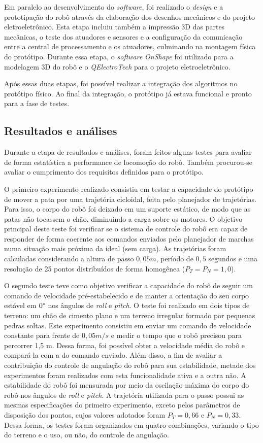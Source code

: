 \documentclass[../main.tex]{subfiles}
\begin{document}
  Em paralelo ao desenvolvimento do \textit{software}, foi realizado o \textit{design} e a prototipação do robô através da elaboração dos desenhos mecânicos e do projeto eletroeletrônico. Esta etapa incluiu também a impressão 3D das partes mecânicas, o teste dos atuadores e sensores e a configuração da comunicação entre a central de processamento e os atuadores, culminando na montagem física do protótipo. Durante essa etapa, o \textit{software} \textit{OnShape} foi utilizado para a modelagem 3D do robô e o \textit{QElectroTech} para o projeto eletroeletrônico.

  Após essas duas etapas, foi possível realizar a integração dos algoritmos no protótipo físico. Ao final da integração, o protótipo já estava funcional e pronto para a fase de testes.

  \subsection{Resultados e análises}
  \label{sec:method_results_analysis}
  Durante a etapa de resultados e análises, foram feitos alguns testes para avaliar de forma estatística a performance de locomoção do robô. Também procurou-se avaliar o cumprimento dos requisitos definidos para o protótipo.

  O primeiro experimento realizado consistiu em testar a capacidade do protótipo de mover a pata por uma trajetória cicloidal, feita pelo planejador de trajetórias. Para isso, o corpo do robô foi deixado em um suporte estático, de modo que as patas não tocassem o chão, diminuindo a carga sobre os motores. O objetivo principal deste teste foi verificar se o sistema de controle do robô era capaz de responder de forma coerente aos comandos enviados pelo planejador de marchas numa situação mais próxima da ideal (sem carga). As trajetórias foram calculadas considerando a altura de passo $0,05m$, período de $0,5$ segundos e uma resolução de 25 pontos distribuídos de forma homogênea ($P_T = P_N = 1,0$).
  
  O segundo teste teve como objetivo verificar a capacidade do robô de seguir um comando de velocidade pré-estabelecido e de manter a orientação do seu corpo estável em $0\degree$ nos ângulos de \textit{roll} e \textit{pitch}. O teste foi realizado em dois tipos de terreno: um chão de cimento plano e um terreno irregular formado por pequenas pedras soltas. Este experimento consistiu em enviar um comando de velocidade constante para frente de $0,05 m/s$ e medir o tempo que o robô precisou para percorrer 1,5 m. Dessa forma, foi possível obter a velocidade média do robô e compará-la com a do comando enviado. Além disso, a fim de avaliar a contribuição do controle de angulação do robô para sua estabilidade, metade dos experimentos foram realizados com esta funcionalidade ativa e a outra não. A estabilidade do robô foi mensurada por meio da oscilação máxima do corpo do robô nos ângulos de \textit{roll} e \textit{pitch}. A trajetória utilizada para o passo possui as mesmas especificações do primeiro experimento, exceto pelos parâmetros de disposição dos pontos, cujos valores adotados foram $P_T = 0,66$ e $P_N = 0,33$. Dessa forma, os testes foram organizados em quatro combinações, variando o tipo do terreno e o uso, ou não, do controle de angulação.
  
\end{document}
